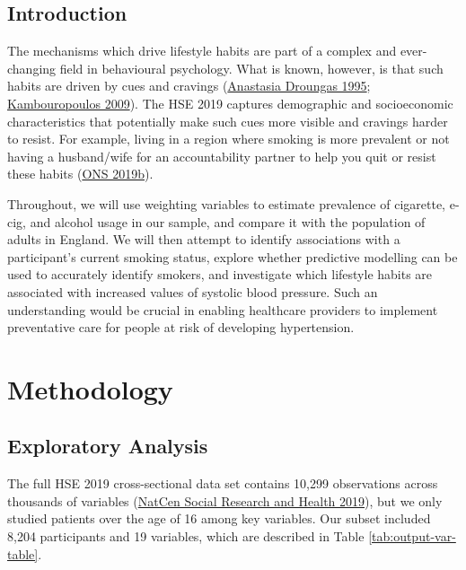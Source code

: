 \documentclass[
  11pt,
  twocolumn]{article}
\begin{document}
\hypertarget{introduction}{%
\subsection{Introduction}\label{introduction}}

The mechanisms which drive lifestyle habits are part of a complex and
ever-changing field in behavioural psychology. What is known, however,
is that such habits are driven by cues and cravings
(\protect\hyperlink{ref-SmokeCue}{Anastasia Droungas 1995};
\protect\hyperlink{ref-DrinkCue}{Kambouropoulos 2009}). The HSE 2019
captures demographic and socioeconomic characteristics that potentially
make such cues more visible and cravings harder to resist. For example,
living in a region where smoking is more prevalent or not having a
husband/wife for an accountability partner to help you quit or resist
these habits (\protect\hyperlink{ref-AccountPartner}{ONS 2019b}).

Throughout, we will use weighting variables to estimate prevalence of
cigarette, e-cig, and alcohol usage in our sample, and compare it with
the population of adults in England. We will then attempt to identify
associations with a participant's current smoking status, explore
whether predictive modelling can be used to accurately identify smokers,
and investigate which lifestyle habits are associated with increased
values of systolic blood pressure. Such an understanding would be
crucial in enabling healthcare providers to implement preventative care
for people at risk of developing hypertension.

\hypertarget{methodology}{%
\section{Methodology}\label{methodology}}

\hypertarget{exploratory-analysis}{%
\subsection{Exploratory Analysis}\label{exploratory-analysis}}

The full HSE 2019 cross-sectional data set contains 10,299 observations
across thousands of variables (\protect\hyperlink{ref-Main}{NatCen
Social Research and Health 2019}), but we only studied patients over the
age of 16 among key variables. Our subset included 8,204 participants
and 19 variables, which are described in Table
\ref{tab:output-var-table}.
\end{document}

